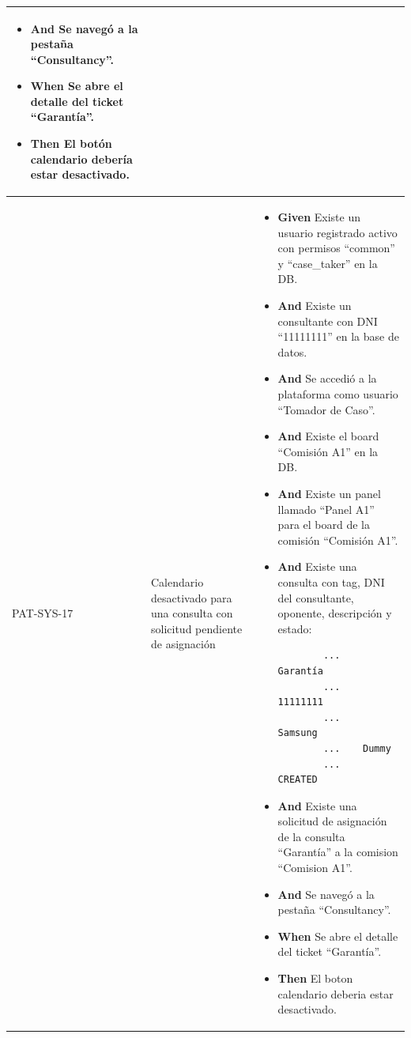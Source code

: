 \begin{longtable}{|p{1cm}|p{2.5cm}|p{12cm}|}
\begin{itemize}
        \begin{verbatim}
        ...    Garantía
        ...    11111111
        ...    Samsung
        ...    Dummy
        ...    CREATED
        \end{verbatim}
        \item \textbf{And} Se navegó a la pestaña ``Consultancy''.
        \newline
        \item \textbf{When} Se abre el detalle del ticket ``Garantía''.
        \newline
        \item \textbf{Then} El botón calendario debería estar desactivado.
    \end{itemize}
    \\
    \hline
    PAT-SYS-17 & Calendario desactivado para una consulta con solicitud pendiente de asignación & 
    \begin{itemize}
        \item \textbf{Given} Existe un usuario registrado activo con permisos ``common'' y ``case\_taker'' en la DB.
        \item \textbf{And} Existe un consultante con DNI ``11111111'' en la base de datos.
        \item \textbf{And} Se accedió a la plataforma como usuario ``Tomador de Caso''.
        \item \textbf{And} Existe el board ``Comisión A1'' en la DB.
        \item \textbf{And} Existe un panel llamado ``Panel A1'' para el board de la comisión ``Comisión A1''.
        \item \textbf{And} Existe una consulta con tag, DNI del consultante, oponente, descripción y estado:
        \begin{verbatim}
        ...    Garantía
        ...    11111111
        ...    Samsung
        ...    Dummy
        ...    CREATED
        \end{verbatim}
        \item \textbf{And} Existe una solicitud de asignación de la consulta ``Garantía'' a la comision ``Comision A1''.
        \item \textbf{And} Se navegó a la pestaña ``Consultancy''.
        \newline
        \item \textbf{When} Se abre el detalle del ticket ``Garantía''.
        \newline
        \item \textbf{Then} El boton calendario deberia estar desactivado.

\end{itemize}
\end{longtable}
